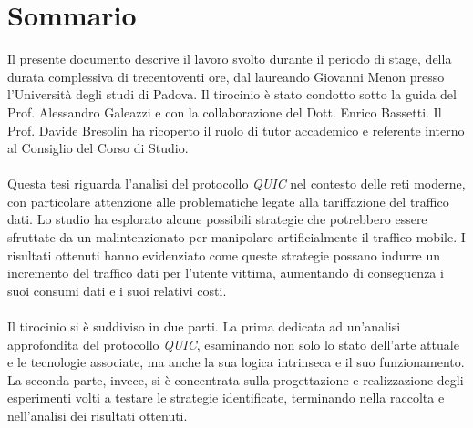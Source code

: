 \cleardoublepage
{}
{}
\begingroup
\let\clearpage\relax
\let\cleardoublepage\relax
\let\cleardoublepage\relax

\chapter*{Sommario}

Il presente documento descrive il lavoro svolto durante il periodo di stage, della durata complessiva di trecentoventi ore, dal laureando Giovanni Menon presso l'Università degli studi di Padova.
Il tirocinio è stato condotto sotto la guida del Prof. Alessandro Galeazzi e con la collaborazione del Dott. Enrico Bassetti.
Il Prof. Davide Bresolin ha ricoperto il ruolo di tutor accademico e referente interno al Consiglio del Corso di Studio.
\\\\
Questa tesi riguarda l'analisi del protocollo \emph{\gls*{QUIC}} nel contesto delle reti moderne, 
con particolare attenzione alle problematiche legate alla tariffazione del traffico dati. Lo studio ha esplorato alcune possibili strategie che potrebbero
essere sfruttate da un malintenzionato per manipolare artificialmente il traffico mobile. 
I risultati ottenuti hanno evidenziato come queste strategie possano indurre un incremento del traffico dati per l'utente vittima, 
aumentando di conseguenza i suoi consumi dati e i suoi relativi costi. 
\\\\
Il tirocinio si è suddiviso in due parti.
La prima dedicata ad un'analisi approfondita del protocollo \emph{QUIC}, esaminando non solo lo stato dell'arte attuale e le tecnologie associate, ma anche la sua logica intrinseca e il suo funzionamento.
La seconda parte, invece, si è concentrata sulla progettazione e realizzazione degli esperimenti volti a testare le strategie identificate, terminando nella raccolta e nell'analisi dei risultati ottenuti.



\endgroup

\vfill
